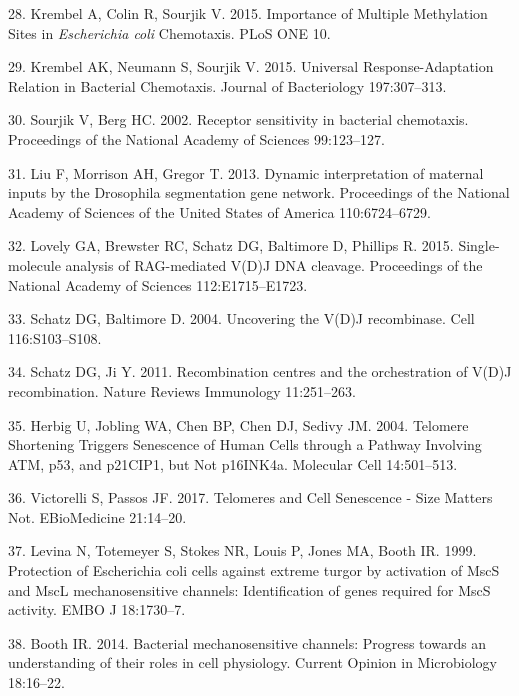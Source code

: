 \hypertarget{ref-krembel2015a}{}
28.
Krembel
A,
Colin
R,
Sourjik
V.
2015.
Importance
of
Multiple
Methylation
Sites
in
\emph{Escherichia
coli}
Chemotaxis.
PLoS
ONE
10.

\hypertarget{ref-krembel2015}{}
29.
Krembel
AK,
Neumann
S,
Sourjik
V.
2015.
Universal
Response-Adaptation
Relation
in
Bacterial
Chemotaxis.
Journal
of
Bacteriology
197:307--313.

\hypertarget{ref-sourjik2002}{}
30.
Sourjik
V,
Berg
HC.
2002.
Receptor
sensitivity
in
bacterial
chemotaxis.
Proceedings
of the
National
Academy
of
Sciences
99:123--127.

\hypertarget{ref-liu2013}{}
31.
Liu F,
Morrison
AH,
Gregor
T.
2013.
Dynamic
interpretation
of
maternal
inputs
by the
Drosophila
segmentation
gene
network.
Proceedings
of the
National
Academy
of
Sciences
of the
United
States
of
America
110:6724--6729.

\hypertarget{ref-lovely2015}{}
32.
Lovely
GA,
Brewster
RC,
Schatz
DG,
Baltimore
D,
Phillips
R.
2015.
Single-molecule
analysis
of
RAG-mediated
V(D)J
DNA
cleavage.
Proceedings
of the
National
Academy
of
Sciences
112:E1715--E1723.

\hypertarget{ref-schatz2004}{}
33.
Schatz
DG,
Baltimore
D.
2004.
Uncovering
the
V(D)J
recombinase.
Cell
116:S103--S108.

\hypertarget{ref-schatz2011}{}
34.
Schatz
DG, Ji
Y.
2011.
Recombination
centres
and
the
orchestration
of
V(D)J
recombination.
Nature
Reviews
Immunology
11:251--263.

\hypertarget{ref-herbig2004}{}
35.
Herbig
U,
Jobling
WA,
Chen
BP,
Chen
DJ,
Sedivy
JM.
2004.
Telomere
Shortening
Triggers
Senescence
of
Human
Cells
through
a
Pathway
Involving
ATM,
p53,
and
p21CIP1,
but
Not
p16INK4a.
Molecular
Cell
14:501--513.

\hypertarget{ref-victorelli2017}{}
36.
Victorelli
S,
Passos
JF.
2017.
Telomeres
and
Cell
Senescence
- Size
Matters
Not.
EBioMedicine
21:14--20.

\hypertarget{ref-levina1999}{}
37.
Levina
N,
Totemeyer
S,
Stokes
NR,
Louis
P,
Jones
MA,
Booth
IR.
1999.
Protection
of
Escherichia
coli
cells
against
extreme
turgor
by
activation
of
MscS
and
MscL
mechanosensitive
channels:
Identification
of
genes
required
for
MscS
activity.
EMBO J
18:1730--7.

\hypertarget{ref-booth2014}{}
38.
Booth
IR.
2014.
Bacterial
mechanosensitive
channels:
Progress
towards
an
understanding
of
their
roles
in
cell
physiology.
Current
Opinion
in
Microbiology
18:16--22.


